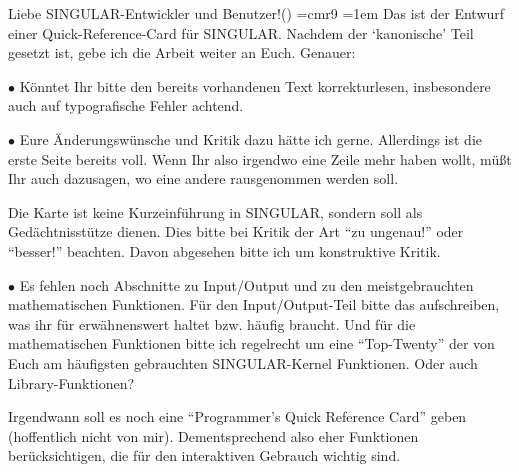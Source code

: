 \sec Liebe SINGULAR-Entwickler und Benutzer!()
\sectext
\font\ninerm=cmr9
\ninerm\baselineskip=11pt
\parindent=1em
Das ist der Entwurf einer Quick-Reference-Card f\"ur SINGULAR.  Nachdem der
`kanonische' Teil gesetzt ist, gebe ich die Arbeit weiter an Euch.  Genauer:

\medskip
\item{$\bullet$} K\"onntet Ihr bitte den bereits vorhandenen Text korrektur\-lesen,
  insbesondere auch auf typografische Fehler achtend.

\item{$\bullet$} Eure \"Anderungsw\"unsche und Kritik dazu h\"atte ich gerne.
  Allerdings ist die erste Seite bereits voll.  Wenn Ihr also irgendwo eine
  Zeile mehr haben wollt, m\"u\ss t Ihr auch dazusagen, wo eine andere
  rausgenommen werden soll.

\hang Die Karte ist keine Kurzeinf\"uhrung in SINGULAR, sondern soll als
  Ged\"achtnisst\"utze dienen.  Dies bitte bei Kritik der Art ``zu ungenau!''
  oder ``besser!'' beachten.  Davon abgesehen bitte ich um konstruktive Kritik.

\item{$\bullet$} Es fehlen noch Abschnitte zu Input/Output und zu den
  meistgebrauchten mathematischen Funktionen.  F\"ur den Input/Output-Teil bitte
  das aufschreiben, was ihr f\"ur erw\"ahnenswert haltet bzw. h\"aufig braucht.
  Und f\"ur die mathematischen Funktionen bitte ich regelrecht um eine
  ``Top-Twenty'' der von Euch am h\"aufigsten gebrauchten SINGULAR-Kernel
  Funktionen.  Oder auch Library-Funktionen?

\hang Irgendwann soll es noch eine ``Programmer's Quick Reference Card''
  geben (hoffentlich nicht von mir).  Dementsprechend also eher Funktionen
  ber\"ucksichtigen, die f\"ur den interaktiven Gebrauch wichtig sind.
\cr
\endsec

\bye
